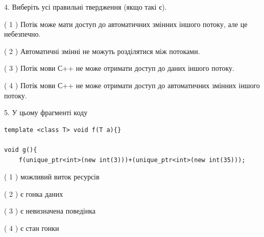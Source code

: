 \documentclass[12pt, ukrainian]{article}
\begin{document}
\begin {large}
{%
4. Виберіть усі правильні твердження (якщо такі є).\par
\vspace{2mm}

( 1 ) Потік може мати доступ до автоматичних змінних іншого потоку, але це небезпечно.%

( 2 ) Автоматичні змінні не можуть розділятися між потоками.%

( 3 ) Потік мови С++ не може отримати доступ до даних іншого потоку.%

( 4 ) Потік мови С++ не може отримати доступ до автоматичних змінних іншого потоку.%


5. У цьому фрагменті коду
\begin{verbatim}
template <class T> void f(T a){}

void g(){
    f(unique_ptr<int>(new int(3)))+(unique_ptr<int>(new int(35)));
\end{verbatim}

( 1 ) можливий виток ресурсів%

( 2 ) є гонка даних%

( 3 ) є невизначена поведінка%

( 4 ) є стан гонки%
}
\end {large}
\end{document}
